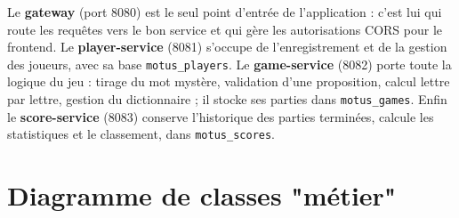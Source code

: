 \documentclass[11pt,a4paper]{article}
\begin{document}
Le \textbf{gateway} (port 8080) est le seul point d'entrée de l'application : c'est lui
qui route les requêtes vers le bon service et qui gère les autorisations CORS pour le
frontend. Le \textbf{player-service} (8081) s'occupe de l'enregistrement et de la
gestion des joueurs, avec sa base \texttt{motus\_players}. Le \textbf{game-service}
(8082) porte toute la logique du jeu : tirage du mot mystère, validation d'une
proposition, calcul lettre par lettre, gestion du dictionnaire ; il stocke ses parties
dans \texttt{motus\_games}. Enfin le \textbf{score-service} (8083) conserve
l'historique des parties terminées, calcule les statistiques et le classement, dans
\texttt{motus\_scores}.

\section{Diagramme de classes "métier"}
\end{document}
